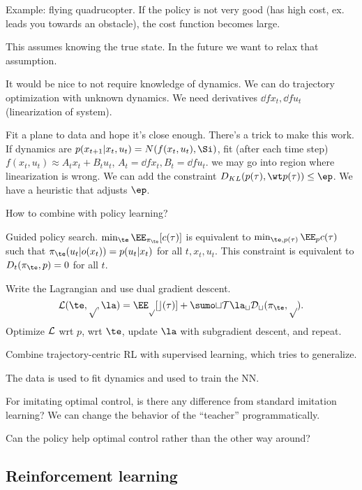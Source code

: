 Example: flying quadrucopter. %
If the policy is not very good (has high cost, ex. leads you towards an obstacle), the cost function becomes large.

This assumes knowing the true state. In the future we want to relax that assumption.

It would be nice to not require knowledge of dynamics. We can do trajectory optimization with unknown dynamics. 
We need derivatives $\dd f{x_t}, \dd f{u_t}$ (linearization of system). 

Fit a plane to data and hope it's close enough.  There's a trick to make this work. If dynamics are $p(x_{t+1}|x_t,u_t) = N(f(x_t,u_t),\Si)$, fit  (after each time step) $f(x_t,u_t) \approx A_tx_t + B_t u_t$, $A_t = \dd f{x_t}, B_t=\dd f{u_t} $. 
we may go into region where linearization is wrong.
We can add the constraint $D_{KL}(p(\tau), \wt p(\tau))\le \ep$. We have a heuristic that adjusts $\ep$.

How to combine with policy learning? 


Guided policy search. $\min_\te \EE_{\pi_\te}[c(\tau)]$ is equivalent to $\min_{\te,p(\tau)} \EE_p c(\tau)$ such that $\pi_\te(u_t|o(x_t)) = p(u_t|x_t)$ for all $t,x_t,u_t$. This constraint is equivalent to $D_t(\pi_\te,p)=0$ for all $t$.

Write the Lagrangian and use dual gradient descent.
$$\cal L(\te,p,\la) = \EE_p[c(\tau)] + \sumo tT \la_t D_t(\pi_\te,p).$$ Optimize $\cal L$ wrt $p$, wrt $\te$, update $\la$ with subgradient descent, and repeat.

Combine trajectory-centric RL with 
supervised learning, which tries to generalize.

The data is used to fit dynamics and used to train the NN.

For imitating optimal control, is there any difference from standard imitation learning? We can change the behavior of the ``teacher'' programmatically.

Can the policy help optimal control rather than the other way around?

\subsection{Reinforcement learning}

